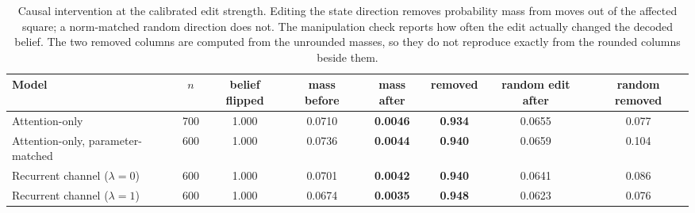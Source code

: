 \begin{table}[t]
\centering\small
\caption{Causal intervention at the calibrated edit strength. Editing the
state direction removes probability mass from moves out of the affected
square; a norm-matched random direction does not. The manipulation check
reports how often the edit actually changed the decoded belief. The two
removed columns are computed from the unrounded masses, so they do not
reproduce exactly from the rounded columns beside them.}
\label{tab:patch}
\begin{tabular}{lccccccc}
\toprule
Model & $n$ & belief flipped & mass before & mass after & removed & random edit after & random removed \\
\midrule
Attention-only & 700 & 1.000 & 0.0710 & \textbf{0.0046} & \textbf{0.934} & 0.0655 & 0.077 \\
Attention-only, parameter-matched & 600 & 1.000 & 0.0736 & \textbf{0.0044} & \textbf{0.940} & 0.0659 & 0.104 \\
Recurrent channel ($\lambda{=}0$) & 600 & 1.000 & 0.0701 & \textbf{0.0042} & \textbf{0.940} & 0.0641 & 0.086 \\
Recurrent channel ($\lambda{=}1$) & 600 & 1.000 & 0.0674 & \textbf{0.0035} & \textbf{0.948} & 0.0623 & 0.076 \\
\bottomrule
\end{tabular}
\end{table}
